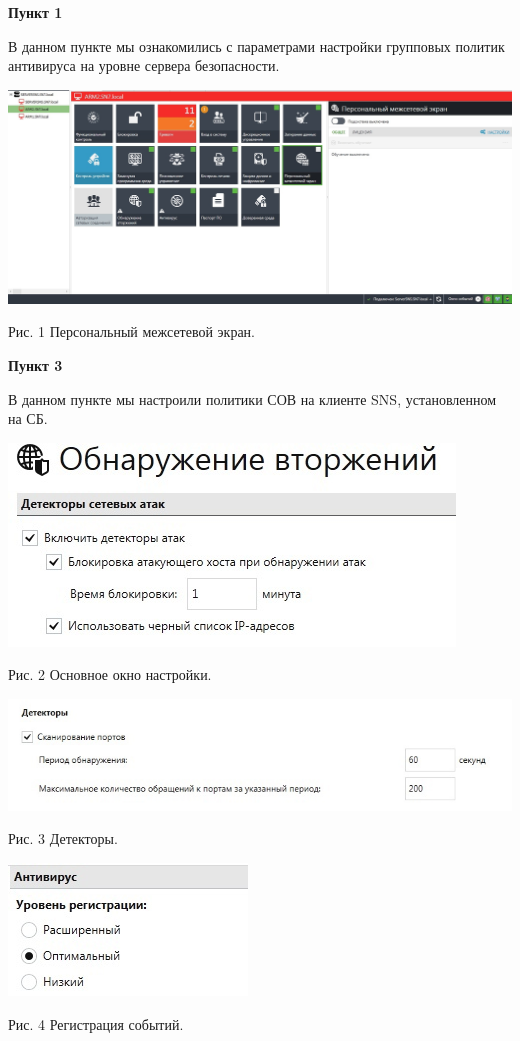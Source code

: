 \documentclass[a4paper,14pt]{extarticle}
\begin{document}
    \textbf{Пункт 1}
    \vspace{-3ex}
    \begin{center}
        \singlespacing
        В данном пункте мы ознакомились с параметрами настройки групповых политик антивируса на
уровне сервера безопасности. 

        \includegraphics[scale=0.3]{pics/1.jpg}

      Рис. 1 Персональный межсетевой экран.
    \end{center}

    \textbf{Пункт 3}
    \vspace{-3ex}
    \begin{center}
        \singlespacing
        В данном пункте мы настроили политики СОВ на клиенте SNS, установленном на СБ.

        \includegraphics[scale=0.8]{pics/3_1.jpg}

        Рис. 2 Основное окно настройки.

        \includegraphics[scale=0.65]{pics/3_2.jpg}

        Рис. 3 Детекторы.

        \includegraphics[scale=0.8]{pics/3_3.jpg}
 
        Рис. 4 Регистрация событий.
    \end{center}
\end{document}
